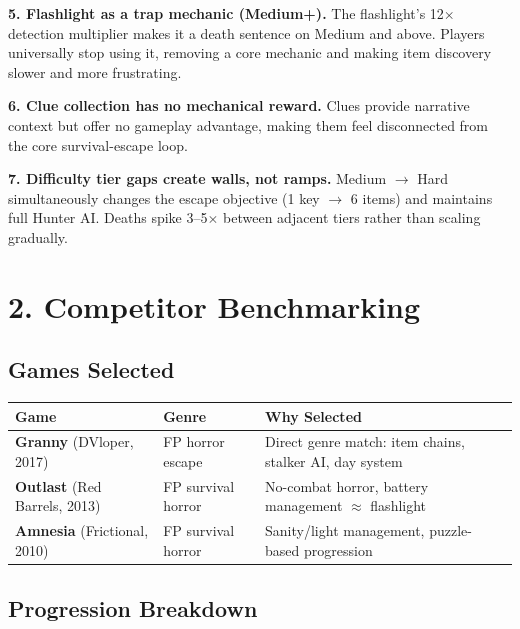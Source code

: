 \documentclass[11pt]{article}
\begin{document}
\textbf{5. Flashlight as a trap mechanic (Medium+).} The flashlight's 12$\times$ detection multiplier makes it a death sentence on Medium and above. Players universally stop using it, removing a core mechanic and making item discovery slower and more frustrating.

\textbf{6. Clue collection has no mechanical reward.} Clues provide narrative context but offer no gameplay advantage, making them feel disconnected from the core survival-escape loop.

\textbf{7. Difficulty tier gaps create walls, not ramps.} Medium $\to$ Hard simultaneously changes the escape objective (1 key $\to$ 6 items) and maintains full Hunter AI. Deaths spike 3--5$\times$ between adjacent tiers rather than scaling gradually.

\newpage

\section{2. Competitor Benchmarking}

\subsection{Games Selected}

\begin{table}[h]
\centering
\small
\begin{tabular}{@{}lll@{}}
\toprule
\textbf{Game} & \textbf{Genre} & \textbf{Why Selected} \\
\midrule
\textbf{Granny} (DVloper, 2017) & FP horror escape & Direct genre match: item chains, stalker AI, day system \\
\textbf{Outlast} (Red Barrels, 2013) & FP survival horror & No-combat horror, battery management $\approx$ flashlight \\
\textbf{Amnesia} (Frictional, 2010) & FP survival horror & Sanity/light management, puzzle-based progression \\
\bottomrule
\end{tabular}
\end{table}

\subsection{Progression Breakdown}
\end{document}
